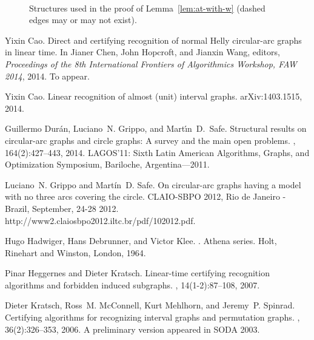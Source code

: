 \documentclass[10pt]{article}
\begin{document}
\begin{figure}[h!]
  \centering
  \,
  \,
\caption{Structures used in the proof of Lemma~\ref{lem:at-with-w}
  (dashed edges may or may not exist).}
  \label{fig:negative-certificate-2}
\end{figure}
\begin{thebibliography}{10}
\small
{}
Yixin Cao.
\newblock Direct and certifying recognition of normal {H}elly circular-arc
  graphs in linear time.
\newblock In Jianer Chen, John Hopcroft, and Jianxin Wang, editors, {\em
  Proceedings of the 8th International Frontiers of Algorithmics Workshop, FAW
  2014}, 2014.
\newblock To appear.

Yixin Cao.
\newblock Linear recognition of almost (unit) interval graphs.
\newblock arXiv:1403.1515, 2014.

Guillermo Dur\'an, Luciano~N. Grippo, and Mart\'\i n~D.~Safe.
\newblock Structural results on circular-arc graphs and circle graphs: A survey
  and the main open problems.
, 164(2):427--443, 2014.
\newblock LAGOS'11: Sixth Latin American Algorithms, Graphs, and Optimization
  Symposium, Bariloche, Argentina---2011.

Luciano~N. Grippo and Mart\'in~D. Safe.
\newblock On circular-arc graphs having a model with no three arcs covering the
  circle.
\newblock CLAIO-SBPO 2012, Rio de Janeiro - Brazil, September, 24-28 2012.
  http://www2.claiosbpo2012.iltc.br/pdf/102012.pdf.

Hugo Hadwiger, Hans Debrunner, and Victor Klee.
.
\newblock Athena series. Holt, Rinehart and Winston, London, 1964.

Pinar Heggernes and Dieter Kratsch.
\newblock Linear-time certifying recognition algorithms and forbidden induced
  subgraphs.
, 14(1-2):87--108, 2007.

Dieter Kratsch, Ross~M. McConnell, Kurt Mehlhorn, and Jeremy~P. Spinrad.
\newblock Certifying algorithms for recognizing interval graphs and permutation
  graphs.
, 36(2):326--353, 2006.
\newblock A preliminary version appeared in SODA 2003.


\end{thebibliography}
\end{document}
